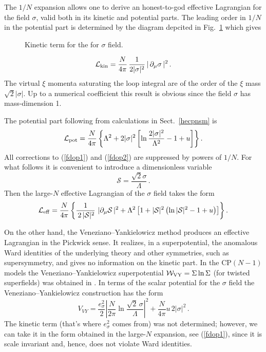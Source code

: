 \documentclass[epsfig,12pt]{article}
\def\beq{\begin{equation}}
\def\eeq{\end{equation}}
\newcommand{\cs}{{\mathcal S}}
\def\beq{\begin{equation}}
\def\eeq{\end{equation}}
\begin{document}
{The $1/N$ expansion allows one to derive an honest-to-god effective
Lagrangian for the field $\sigma$, valid both in its kinetic and potential parts. The  leading order in
$1/N$ in the potential part is determined by the diagram depcited in Fig.~\ref{dopone}
which gives
\begin{figure}
\epsfxsize=6cm
\centerline{}
\caption{\small
Kinetic term for the  for  $\sigma$ field. }
\label{dopone}
\end{figure}
\beq
{\mathcal L}_{\rm kin} =\frac{N}{4\pi}\,\frac{1}{2|\sigma|^2}\,| \,  \partial_\mu\sigma \,|^2
\,.
\label{fdop1}
\eeq
The  virtual $\xi$ momenta saturating the loop integral are of the order of the $\xi$
mass $\sqrt{2}|\sigma|$. Up to a numerical coefficient this result is obvious since the field
$\sigma$ has mass-dimension 1.

The potential part following from calculations in Sect.~\ref{hecpnsm}
is 
\beq
{\mathcal L}_{\rm pot} = \frac{N}{4\pi}\left\{\Lambda^2 +2|\sigma|^2\left[
\ln\frac{2|\sigma|^2}{\Lambda^2}-1+u\right]
\right\}.
\label{fdop2}
\eeq
All corrections to (\ref{fdop1}) and  (\ref{fdop2}) are suppressed by powers
of $1/N$. For what follows it is convenient to introduce a dimensionless variable
\beq
\cs = \frac{ \sqrt{2}\sigma}{\Lambda}\,.
\eeq
Then the large-$N$ effective Lagrangian of the $\sigma$ field takes the form
\beq
{\mathcal L}_{\rm eff} =\frac{N}{4\pi}
\left\{
\frac{1}{\,2\, |\cs|^2}\,\,
 | \partial_\mu\cs \, |^2
+\Lambda^2
\left[1 +|\cs |^2\left( \ln |\cs|^2 -1+u\right)\right]
\right\}.
\label{fdop3}
\eeq

On the other hand, 
the Veneziano--Yankielowicz method \cite{VYan} produces 
an effective Lagrangian in the Pickwick sense. It realizes, in a superpotential,  the  anomalous Ward identities of the 
underlying theory
and other symmetries, such as supersymmetry, and gives no information on the kinetic
part. In the CP$(N-1)$ models
the Veneziano--Yankielowicz superpotential ${\mathcal W}_{\rm VY} = \Sigma \ln \Sigma $ (for twisted superfields)
was obtained in \cite{AdDVecSal,ChVa,W93}. 
In terms of the scalar potential for the $\sigma$ field
the Veneziano--Yankielowicz  construction has the form
\beq
V_{VY} = \frac{e^2_\sigma}{2} \left|\frac{N}{2\pi}
\ln\frac{\sqrt{2}\, \sigma}{\Lambda}\right|^2
+\frac{N}{4\pi} u\,2|\sigma|^2\,.
\label{fdop4}
\eeq
The kinetic term (that's where $e^2_\sigma$ comes from) was not determined; however, we can take
it in the form obtained in the large-$N$ expansion, see (\ref{fdop1}),
since it is scale invariant and, hence,  does not violate Ward identities.

}
\end{document}
